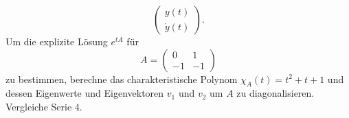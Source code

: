 \documentclass[../main.tex]{subfiles}
\begin{document}
\begin{examples}
\begin{enumerate}[(1)]
\[\begin{pmatrix}
          y(t) \\
          \dot y(t)
        \end{pmatrix}.
      \]
      Um die explizite Lösung $e^{tA}$ für
      \[
        A =
        \begin{pmatrix}
          0 & 1 \\
          -1 & -1
        \end{pmatrix}
      \]
      zu bestimmen,
      berechne das charakteristische
      Polynom $\chi_{A}(t) = t^2 + t + 1$
      und dessen Eigenwerte und Eigenvektoren
      $v_1$ und $v_2$
      um $A$ zu diagonalisieren.
      Vergleiche Serie 4.
  \end{enumerate}
\end{examples}
\end{document}
